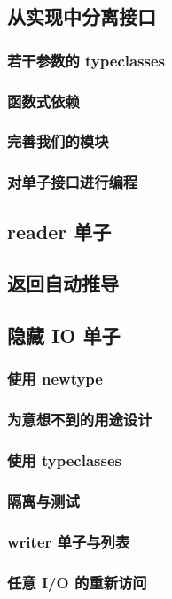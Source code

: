 \documentclass[./main.tex]{subfiles}
\begin{document}
\subsection*{从实现中分离接口}

\subsubsection*{若干参数的 typeclasses}

\subsubsection*{函数式依赖}

\subsubsection*{完善我们的模块}

\subsubsection*{对单子接口进行编程}

\subsection*{reader 单子}

\subsection*{返回自动推导}

\subsection*{隐藏 IO 单子}

\subsubsection*{使用 newtype}

\subsubsection*{为意想不到的用途设计}

\subsubsection*{使用 typeclasses}

\subsubsection*{隔离与测试}

\subsubsection*{writer 单子与列表}

\subsubsection*{任意 I/O 的重新访问}
\end{document}

